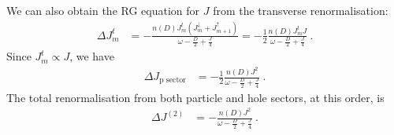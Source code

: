 \documentclass[10pt]{iopart}
\begin{document}
We can also obtain the RG equation for \(J\) from the transverse renormalisation:
\begin{eqnarray}
	\Delta J^t_m &= - \frac{n(D)J^t_m \left( J^\downarrow_m + J^\uparrow_{m+1} \right) }{\omega - \frac{D}{2} + \frac{J}{4}} = -\frac{1}{2}\frac{n(D)J^t_m J}{\omega - \frac{D}{2} + \frac{J}{4}}~.
\end{eqnarray}
Since \(J^t_m \propto J\), we have
\begin{eqnarray}
	\Delta J_\text{p sector} &= -\frac{1}{2}\frac{n(D)J^2}{\omega - \frac{D}{2} + \frac{J}{4}}~.
\end{eqnarray}
The total renormalisation from both particle and hole sectors, at this order, is
\begin{eqnarray}
	\Delta J^{(2)} &= -\frac{n(D)J^2}{\omega - \frac{D}{2} + \frac{J}{4}}~.
\end{eqnarray}
\end{document}
